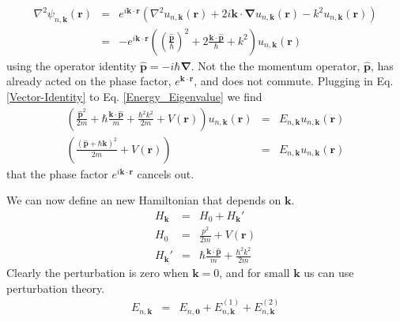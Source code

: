 \documentclass{article}
\begin{document}
\begin{eqnarray}\label{Vector-Identity}
    \nabla^2\psi_{n, \mathbf{k}}(\mathbf{r}) & = & e^{i \mathbf{k} \cdot \mathbf{r}}\left(\nabla^2 u_{n,\mathbf{k}} (\mathbf{r}) + 2 i \mathbf{k} \cdot \mathbf{\nabla} u_{n,\mathbf{k}}(\mathbf{r})  - k^2 u_{n, \mathbf{k}} (\mathbf{r}) \right) \nonumber \\
    & = & - e^{i \mathbf{k} \cdot \mathbf{r}} \left( \left(\frac{\mathbf{\hat{p}}}{\hbar} \right)^2  + 2 \frac{ \mathbf{k} \cdot \mathbf{\hat{p}} }{\hbar} + k^2 \right) u_{n, \mathbf{k}}(\mathbf{r})
\end{eqnarray}
using the operator identity $\mathbf{\hat{p}}=-i\hbar \mathbf{\nabla}$. Not the the momentum operator, $\mathbf{\hat{p}}$, has already acted on the phase factor, $ e^{\mathbf{k}\cdot \mathbf{r}}$, and does not commute. Plugging in Eq. \ref{Vector-Identity} to Eq. \ref{Energy_Eigenvalue} we find
\begin{eqnarray}
    \left( \frac{\mathbf{\hat{p}}^2}{2m}  + \hbar \frac{\mathbf{k}\cdot \mathbf{\hat{p}}}{m} + \frac{\hbar^2 k^2 }{2m} + V(\mathbf{r}) \right) u_{n, \mathbf{k}} (\mathbf{r}) & = & E_{n, \mathbf{k}} u_{n, \mathbf{k}} ( \mathbf{r} ) \nonumber \\
    \left( \frac{\left( \mathbf{\hat{p}} + \hbar \mathbf{k} \right)^2}{2m} + V( \mathbf{r} ) \right) & = & E_{n, \mathbf{k}} u_{n, \mathbf{k}} ( \mathbf{r} )
\end{eqnarray}
that the phase factor $e^{i \mathbf{k} \cdot \mathbf{r}}$ cancels out.

We can now define an new Hamiltonian that depends on $\mathbf{k}$.
\begin{eqnarray}
    H_{\mathbf{k}} & = & H_0 + H_{\mathbf{k}}' \\
    H_0 & = & \frac{p^2}{2m} + V(\mathbf{r}) \\
    H_{\mathbf{k}}' & = & \hbar \frac{\mathbf{k}\cdot \mathbf{\hat{p}}}{m} + \frac{\hbar^2 k^2 }{2m}
\end{eqnarray}
Clearly the perturbation is zero when $\mathbf{k}=0$, and for small $\mathbf{k}$ us can use perturbation theory.
\begin{eqnarray}
    E_{n, \mathbf{k} } & = & E_{n, \mathbf{0}} + E_{n , \mathbf{k}}^{(1)} + E_{n, \mathbf{k}}^{(2)}
\end{eqnarray}
\end{document}
